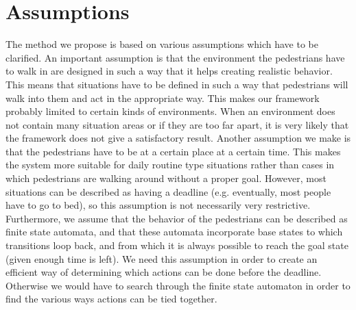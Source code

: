\documentclass[11pt]{book}
\begin{document}

\section{Assumptions}
The method we propose is based on various assumptions which have to be clarified. An important assumption is that the environment the pedestrians have to walk in are designed in such a way that it helps creating realistic behavior. This means that situations have to be defined in such a way that pedestrians will walk into them and act in the appropriate way. This makes our framework probably limited to certain kinds of environments. When an environment does not contain many situation areas or if they are too far apart, it is very likely that the framework does not give a satisfactory result.
Another assumption we make is that the pedestrians have to be at a certain place at a certain time. This makes the system more suitable for daily routine type situations rather than cases in which pedestrians are walking around without a proper goal. However, most situations can be described as having a deadline (e.g. eventually, most people have to go to bed), so this assumption is not necessarily very restrictive.\\
Furthermore, we assume that the behavior of the pedestrians can be described as finite state automata,  and that these automata incorporate base states to which transitions loop back, and from which it is always possible to reach the goal state (given enough time is left). We need this assumption in order to create an efficient way of determining which actions can be done before the deadline. Otherwise we would have to search through the finite state automaton in order to find the various ways actions can be tied together.\\
\end{document}
